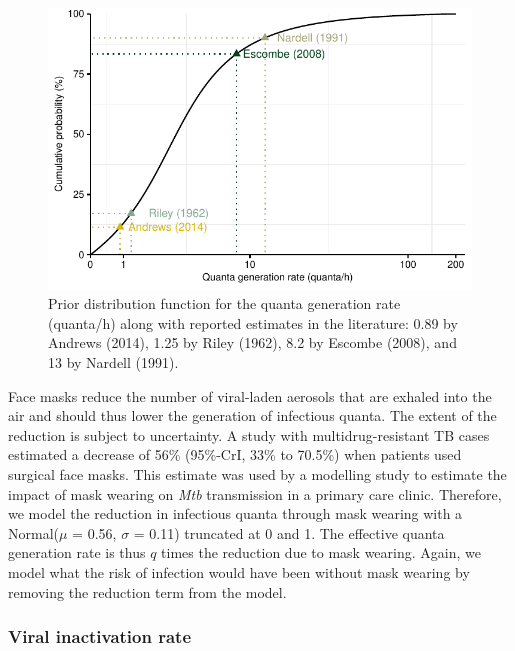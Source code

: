 \documentclass[fleqn,11pt]{wlscirep_supp}
\begin{document}
\begin{figure}[!htpb]
    \centering
    \includegraphics{illustrations/prior-q.pdf}
    \caption{Prior distribution function for the quanta generation rate (quanta/h) along with reported estimates in the literature: 0.89 by Andrews (2014)\cite{Andrews2014JID}, 1.25 by Riley (1962)\cite{Riley1962ARRD}, 8.2 by Escombe (2008)\cite{Escombe2008PLoSMed}, and 13 by Nardell (1991)\cite{Nardell1991ARRD}.}
    \label{fig:quanta-distribution}
\end{figure}


Face masks reduce the number of viral-laden aerosols that are exhaled into the air\cite{Milton2013PLoSPathogens,Leung2020NatMed} and should thus lower the generation of infectious quanta. The extent of the reduction is subject to uncertainty. A study with multidrug-resistant TB cases estimated a decrease of 56\% (95\%-CrI, 33\% to 70.5\%) when patients used surgical face masks\cite{Dharmadhikari2012AJRCCM}. This estimate was used by a modelling study to estimate the impact of mask wearing on \emph{Mtb} transmission in a primary care clinic. Therefore, we model the reduction in infectious quanta through mask wearing with a Normal($\mu$ = 0.56, $\sigma$ = 0.11) truncated at 0 and 1. The effective quanta generation rate is thus $q$ times the reduction due to mask wearing. Again, we model what the risk of infection would have been without mask wearing by removing the reduction term from the model. 

\subsubsection{Viral inactivation rate}
\end{document}
